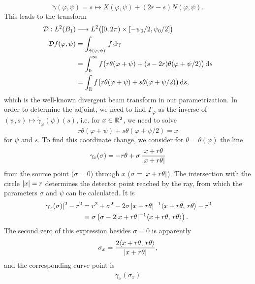 \documentclass{amsart}
\renewcommand*{\phi}{\varphi}
\begin{document}
\begin{example}
 \begin{equation*}
  \tilde \gamma(\phi, \psi) = s \mapsto X(\phi,\psi) + (2r-s) N(\phi,\psi).
 \end{equation*}
 This leads to the transform
 \begin{align}
  \OPD: L^2(B_1) &\Lto L^2\big([0,2\pi) \times [-\psi_0/2, \psi_0/2]\big)\\
  \OPD f(\phi, \psi)
  &= \int_{\tilde \gamma(\phi,\psi)}\, f \, \D \gamma \notag \\
  &= \int_0^\infty f\big(r\theta(\phi + \psi) + (s-2r)\theta(\phi + \psi/2)\big)\, \D s \notag \\
  \label{eq:fanbeam_fwd_op_parametr}
  &= \int_\RR f\big(r\theta(\phi + \psi) + s\theta(\phi + \psi/2)\big)\, \D s,
 \end{align}
 which is the well-known divergent beam transform in our parametrization. In order to determine the adjoint, we need to find
 $\Gamma_\phi$ as the inverse of $(\psi, s) \mapsto \tilde \gamma_\phi(\psi)(s)$, i.e. for $x \in {\ensuremath{\mathbb{R}}}^2$, we need to solve
 \begin{equation*}
  r\theta(\phi + \psi) + s\theta(\phi + \psi/2) = x
 \end{equation*}
 for $\psi$ and $s$. To find this coordinate change, we consider for $\theta=\theta(\phi)$ the line
 \begin{equation*}
  \gamma_x(\sigma) = -r\theta + \sigma\, \frac{x+r\theta}{|x + r \theta|}
 \end{equation*}
 from the source point ($\sigma=0$) through $x$ ($\sigma=|x+r\theta|$). The intersection with the circle $|x|=r$ determines the 
 detector point reached by the ray, from which the parameters $\sigma$ and $\psi$ can be calculated. It is
 \begin{align*}
  |\gamma_x(\sigma)|^2 - r^2 
  &= r^2 + \sigma^2 - 2 \sigma\, |x + r \theta|^{-1} \langle x + r \theta,\,r\theta\rangle - r^2 \\
  &= \sigma \left(\sigma - 2 |x + r \theta|^{-1} \langle x + r \theta,\,r \theta\rangle\right).
 \end{align*}
 The second zero of this expression besides $\sigma=0$ is apparently
 \begin{equation}
  \label{eq:fanbeam_intersec_param}
  \sigma_x = \frac{2 \langle x + r \theta,\,r \theta\rangle}{|x + r \theta|} ,
 \end{equation} 
 and the corresponding curve point is
 \begin{align*}
  \gamma_x(\sigma_x) 

\end{align*}
\end{example}
\end{document}
